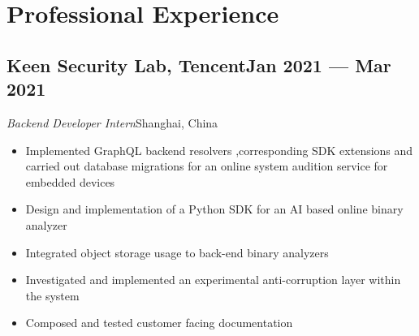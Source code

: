 \documentclass[a4,12pt]{article}
\newcommand{\subtext}[1]{
#1\par\vspace{-0.3cm}}
\newenvironment{zitemize}{
\begin{itemize}\itemsep0pt \parskip0pt \parsep1pt}
{\end{itemize}\vspace{-0.5cm}}
\begin{document}
\section{\textbf{Professional Experience}}

        

\subsection*{Keen Security Lab, Tencent\hfill Jan 2021 --- Mar 2021} 
\subtext{\textit{Backend Developer Intern}\hfill Shanghai, China} 
    \begin{zitemize}
        \item Implemented GraphQL backend resolvers ,corresponding SDK extensions and carried out database migrations for an online system audition service for embedded devices
        \item Design and implementation of a Python SDK for an AI based online binary analyzer
        \item Integrated object storage usage to back-end binary analyzers
        \item Investigated and implemented an experimental anti-corruption layer within the system
        \item Composed and tested customer facing documentation 
    \end{zitemize}


\end{document}
